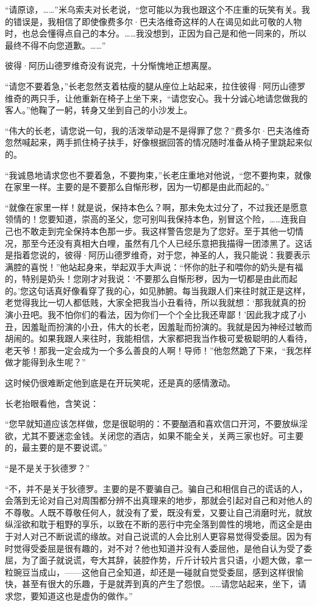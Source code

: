\par “请原谅，……”米乌索夫对长老说，“您可能以为我也跟这个不庄重的玩笑有关。我的错误是，我相信了即使像费多尔·巴夫洛维奇这样的人在谒见如此可敬的人物时，也总会懂得点自己的本分。……我没想到，正因为自己是和他一同来的，所以最终不得不向您道歉。……”
\par 彼得·阿历山德罗维奇没有说完，十分惭愧地正想离屋。
\par “请您不要着急，”长老忽然支着枯瘦的腿从座位上站起来，拉住彼得·阿历山德罗维奇的两只手，让他重新在椅子上坐下来，“请您安心。我十分诚心地请您做我的客人。”他鞠了一躬，转身又坐到自己的小沙发上。
\par “伟大的长老，请您说一句，我的活泼举动是不是得罪了您？”费多尔·巴夫洛维奇忽然喊起来，两手抓住椅子扶手，好像根据回答的情况随时准备从椅子里跳起来似的。
\par “我诚恳地请求您也不要着急，不要拘束，”长老庄重地对他说，“您不要拘束，就像在家里一样。主要的是不要那么自惭形秽，因为一切都是由此而起的。”
\par “就像在家里一样！就是说，保持本色么？啊，那未免太过分了，不过我还是愿意领情的！您要知道，崇高的圣父，您可别叫我保持本色，别冒这个险，……连我自己也不敢走到完全保持本色那一步。我这样警告您是为了您好。至于其他一切情况，那至今还没有真相大白哩，虽然有几个人已经乐意把我描得一团漆黑了。这话是指着您说的，彼得·阿历山德罗维奇，对于您，神圣的人，我只能说：我要表示满腔的喜悦！”他站起身来，举起双手大声说：“怀你的肚子和喂你的奶头是有福的，特别是奶头！您刚才对我说：‘不要那么自惭形秽，因为一切都是由此而起的。’您这句话真好像看穿了我的心，如见肺腑。每当我跟人们来往时就正是这样，老觉得我比一切人都低贱，大家全把我当小丑看待，所以我就想：‘那我就真的扮演小丑吧。我不怕你们的看法，因为你们一个个全比我还卑鄙！’因此我才成了小丑，因羞耻而扮演的小丑，伟大的长老，因羞耻而扮演的。我就是因为神经过敏而胡闹的。如果我跟人来往时，我能相信，大家都把我当作极可爱极聪明的人看待，老天爷！那我一定会成为一个多么善良的人啊！导师！”他忽然跪了下来，“我怎样做才能得到永生呢？”
\par 这时候仍很难断定他到底是在开玩笑呢，还是真的感情激动。
\par 长老抬眼看他，含笑说：
\par “您早就知道应该怎样做，您是很聪明的：不要酗酒和喜欢信口开河，不要放纵淫欲，尤其不要迷恋金钱。关闭您的酒店，如果不能全关，关两三家也好。可主要的，最主要的是不要说谎。”
\par “是不是关于狄德罗？”
\par “不，并不是关于狄德罗。主要的是不要骗自己。骗自己和相信自己的谎话的人，会落到无论对自己对周围都分辨不出真理来的地步，那就会引起对自己和对他人的不尊敬。人既不尊敬任何人，就没有了爱，既没有爱，又要让自己消磨时光，就放纵淫欲和耽于粗野的享乐，以致在不断的恶行中完全落到兽性的境地，而这全是由于对人对己不断说谎的缘故。对自己说谎的人会比别人更容易觉得受委屈。因为有时觉得受委屈是很有趣的，对不对？他也知道并没有人委屈他，是他自认为受了委屈，为了面子就说谎，夸大其辞，装腔作势，斤斤计较片言只语，小题大做，拿一粒豌豆当成山，——这他自己全知道，却还是一碰就自觉受委屈，感到这样很愉快，甚至有很大的乐趣，于是就弄到真的产生了怨恨。……请您站起来，坐下，请求您，要知道这也是虚伪的做作。”
